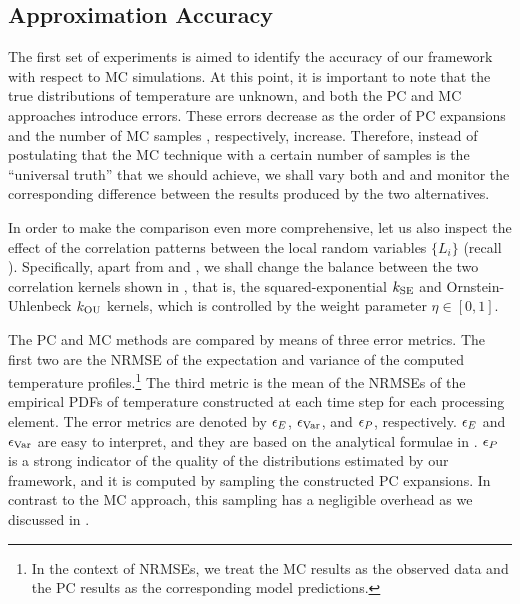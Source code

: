 \subsection{Approximation Accuracy}

The first set of experiments is aimed to identify the accuracy of our framework
with respect to MC simulations. At this point, it is important to note that the
true distributions of temperature are unknown, and both the PC and MC approaches
introduce errors. These errors decrease as the order of PC expansions \lc and
the number of MC samples \ns, respectively, increase. Therefore, instead of
postulating that the MC technique with a certain number of samples is the
``universal truth'' that we should achieve, we shall vary both \lc and \ns and
monitor the corresponding difference between the results produced by the two
alternatives.

In order to make the comparison even more comprehensive, let us also inspect the
effect of the correlation patterns between the local random variables $\{ L_i
\}$ (recall ). Specifically, apart from \lc and \ns,
we shall change the balance between the two correlation kernels shown in
, that is, the squared-exponential $k_{\mathrm{SE}}$ and
Ornstein-Uhlenbeck $k_{\mathrm{OU}}$ kernels, which is controlled by the weight parameter
$\eta \in [0, 1]$.

The PC and MC methods are compared by means of three error metrics. The first
two are the \acf{NRMSE} of the expectation and variance of the computed
temperature profiles.\footnote{In the context of \acp{NRMSE}, we treat the MC
results as the observed data and the PC results as the corresponding model
predictions.} The third metric is the mean of the \acp{NRMSE} of the empirical
PDFs of temperature constructed at each time step for each processing element.
The error metrics are denoted by $\epsilon_{\expectation}$,
$\epsilon_{\variance}$, and $\epsilon_{\probability}$, respectively.
$\epsilon_{\expectation}$ and $\epsilon_{\variance}$ are easy to interpret, and
they are based on the analytical formulae in .
$\epsilon_{\probability}$ is a strong indicator of the quality of the
distributions estimated by our framework, and it is computed by sampling the
constructed PC expansions. In contrast to the MC approach, this sampling has a
negligible overhead as we discussed in .

